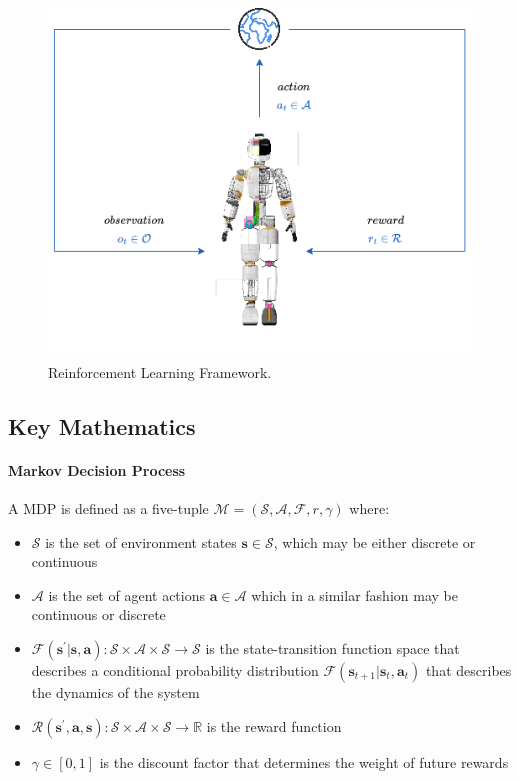 \begin{figure}
    \centering
    \caption{Reinforcement Learning Framework.}
    \label{fig:rlframework}
    \includegraphics[width=.7\textwidth]{Images/rl_ergocub.png}
\end{figure}

\subsection{Key Mathematics}

\paragraph{Markov Decision Process} A \ac{MDP} is defined as a five-tuple $\mathcal{M} = (\mathcal{S}, \mathcal{A}, \mathcal{F}, r, \gamma)$ where:

\begin{itemize}
    \item $\mathcal{S}$ is the set of environment states $\mathbf{s} \in \mathcal{S}$, which may be either discrete or continuous
    \item $\mathcal{A}$ is the set of agent actions $\mathbf{a} \in \mathcal{A}$ which in a similar fashion may be continuous or discrete
    \item $\mathcal{F} (\mathbf{s}^\prime | \mathbf{s}, \mathbf{a}): \mathcal{S} \times \mathcal{A} \times \mathcal{S} \rightarrow \mathcal{S}$ is the state-transition function space that describes a conditional probability distribution $\mathcal{F}(\mathbf{s} _{t+1}|\mathbf{s}_t, \mathbf{a} _t)$ that describes the dynamics of the system
    \item $\mathcal{R} (\mathbf{s}^\prime, \mathbf{a}, \mathbf{s}): \mathcal{S} \times \mathcal{A} \times \mathcal{S} \rightarrow \mathbb{R}$ is the reward function
    \item $\gamma \in [0,1]$ is the discount factor that determines the weight of future rewards
\end{itemize}

